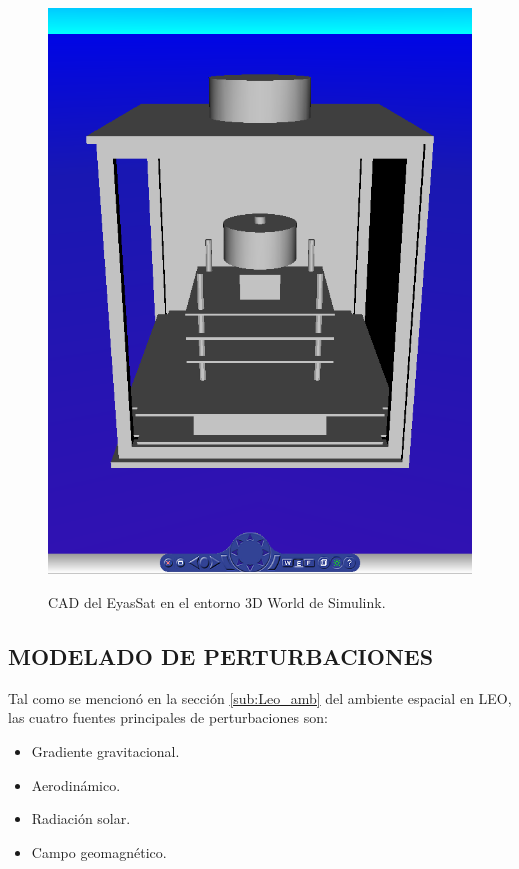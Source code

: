 \begin{figure}[h!]
	\begin{center}
		\includegraphics[scale=0.32]{imagenes/modelo_dinamico/escenario.PNG}\\
	\end{center}
	\caption{CAD del EyasSat en el entorno 3D World de Simulink.}
	\label{fig:escenario}
	\textit{}
\end{figure}
\newpage

\subsection{MODELADO DE PERTURBACIONES}

Tal como se mencionó en la sección \ref{sub:Leo_amb} del ambiente espacial en LEO, las cuatro fuentes principales de perturbaciones son: 
\begin{itemize}
	\item Gradiente gravitacional.
	\item Aerodinámico. 
	\item Radiación solar.
	\item Campo geomagnético.
\end{itemize}


